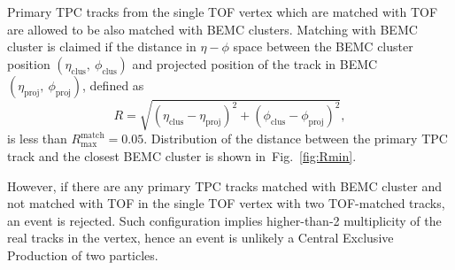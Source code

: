 Primary TPC tracks from the single TOF vertex which are matched with TOF are allowed to be also matched with BEMC clusters. Matching with BEMC cluster is claimed if the distance in $\eta-\phi$ space between the BEMC cluster position $(\eta_{\text{clus}},~\phi_{\text{clus}})$ and projected position of the track in BEMC $(\eta_{\text{proj}},~\phi_{\text{proj}})$, defined as
\begin{equation}\label{eq:etaPhiR}
 R=\sqrt{(\eta_{\text{clus}}-\eta_{\text{proj}})^{2} + (\phi_{\text{clus}}-\phi_{\text{proj}})^{2}},
\end{equation}
is less than $R^{\text{match}}_{\text{max}} = 0.05$. Distribution of the distance between the primary TPC track and the closest BEMC cluster is shown in~Fig.~\ref{fig:Rmin}.

However, if there are any primary TPC tracks matched with BEMC cluster and not matched with TOF in the single TOF vertex with two TOF-matched tracks, an event is rejected. Such configuration implies higher-than-2 multiplicity of the real tracks in the vertex, hence an event is unlikely a Central Exclusive Production of two particles.



